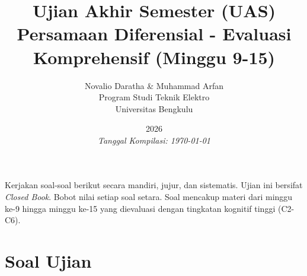 \documentclass[11pt,a4paper]{article}
\title{\vspace{-2cm}\textbf{Ujian Akhir Semester (UAS)\\Persamaan Diferensial - Evaluasi Komprehensif (Minggu 9-15)}}
\author{Novalio Daratha \& Muhammad Arfan\\Program Studi Teknik Elektro\\Universitas Bengkulu}
\date{2026 \\ \vspace{2mm}\small\textit{Tanggal Kompilasi: \today}}
\begin{document}
\maketitle

\begin{tcolorbox}[colback=red!5!white,colframe=red!75!black,title=Instruksi Ujian Akhir Semester]
Kerjakan soal-soal berikut secara mandiri, jujur, dan sistematis. Ujian ini bersifat \textit{Closed Book}. Bobot nilai setiap soal setara. Soal mencakup materi dari minggu ke-9 hingga minggu ke-15 yang dievaluasi dengan tingkatan kognitif tinggi (C2-C6).
\end{tcolorbox}

\section*{Soal Ujian}
\end{document}

